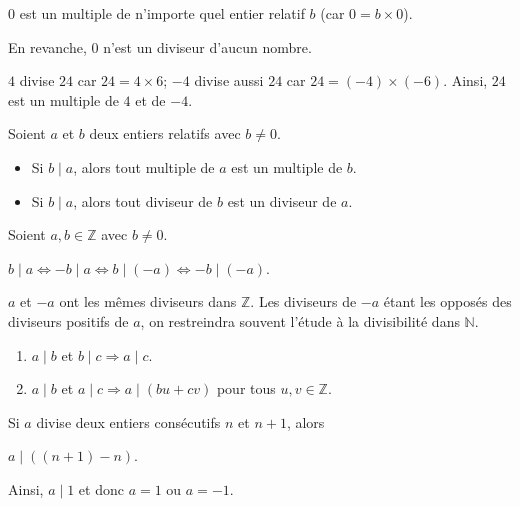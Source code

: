 \remarque
		$0$ est un multiple de n'importe quel entier relatif $b$
		(car $0=b\times 0$).

		En revanche, $0$ n'est un diviseur d'aucun nombre.


	\begin{exemple}

		$4$ divise $24$ car $24=4\times6$;
		$-4$ divise aussi $24$ car $24=(-4)\times(-6)$.
		Ainsi, $24$ est un multiple de $4$ et de $-4$.

	\end{exemple}

	\begin{propriete}{}{}

		Soient $a$ et $b$ deux entiers relatifs avec $b\neq0$.

		\begin{itemize}[label=\textbullet]
			\item Si $b\mid a$, alors tout multiple de $a$ est un multiple de $b$.
			\item Si $b\mid a$, alors tout diviseur de $b$ est un diviseur de $a$.
		\end{itemize}

	\end{propriete}

	\begin{propriete}{}{}

		Soient $a,b\in\mathbb Z$ avec $b\neq0$.

		$b\mid a\iff -b\mid a\iff b\mid(-a)\iff -b\mid(-a).$

	\end{propriete}

	\consequence
	$a$ et $-a$ ont les mêmes diviseurs dans $\mathbb Z$. Les diviseurs de $-a$ étant les opposés des diviseurs positifs de $a$, on restreindra souvent l'étude à la divisibilité dans $\mathbb N$.

	\begin{propriete}{}{}

		\begin{enumerate}
			\item $a\mid b$ et $b\mid c \Rightarrow a\mid c$.

			\item $a\mid b$ et $a\mid c \Rightarrow a\mid(bu+cv)$ pour tous
			$u,v\in\mathbb Z$.

		\end{enumerate}

	\end{propriete}
	\begin{exemple}

		Si $a$ divise deux entiers consécutifs $n$ et $n+1$, alors

		$a\mid((n+1)-n)$.

		Ainsi, $a\mid1$ et donc $a=1$ ou $a=-1$.

	\end{exemple}

